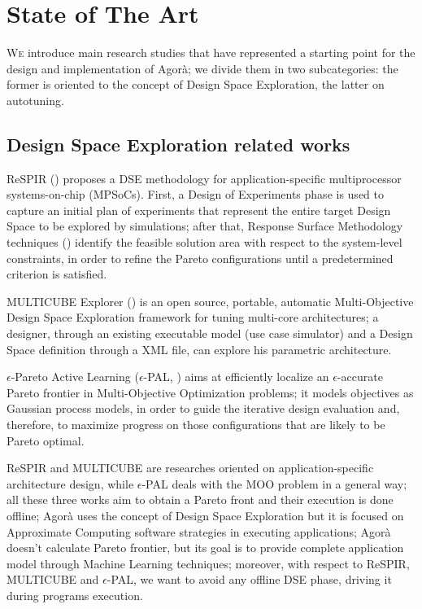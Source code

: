 \chapter{State of The Art}\label{sota}

\lettrine{W}{e} introduce main research studies that have represented a starting point for the design and implementation of A\-go\-rà; we divide them in two subcategories: the former is oriented to the concept of Design Space Exploration, the latter on autotuning.

\section{Design Space Exploration related works}

ReSPIR (\cite{palermo2009respir}) proposes a DSE methodology for application-specific multiprocessor systems-on-chip (MPSoCs). First, a Design of Experiments phase is used to capture an initial plan of experiments that represent the entire target Design Space to be explored by simulations; after that, Response Surface Methodology techniques (\cite{khuri2010response}) identify the feasible solution area with respect to the system-level constraints, in order to refine the Pareto configurations until a predetermined criterion is satisfied.

MULTICUBE Explorer (\cite{silvano2011multicube}) is an open source, portable, automatic Multi-Objective Design Space Exploration framework for tuning multi-core architectures; a designer, through an existing executable model (use case simulator) and a Design Space definition through a XML file, can explore his parametric architecture.

$\epsilon$-Pareto Active Learning ($\epsilon$-PAL, \cite{zuluaga2016e}) aims at efficiently localize an $\epsilon$-accurate Pareto frontier in Multi-Objective Optimization problems; it models objectives as Gaussian process models, in order to guide the iterative design evaluation and, therefore, to maximize progress on those configurations that are likely to be Pareto optimal.

ReSPIR and MULTICUBE are researches oriented on application-specific architecture design, while $\epsilon$-PAL deals with the MOO problem in a general way; all these three works aim to obtain a Pareto front and their execution is done offline; Agorà uses the concept of Design Space Exploration but it is focused on Approximate Computing software strategies in executing applications; Agorà doesn't calculate Pareto frontier, but its goal is to provide complete application model through Machine Learning techniques; moreover, with respect to ReSPIR, MULTICUBE and $\epsilon$-PAL, we want to avoid any offline DSE phase, driving it during programs execution.

